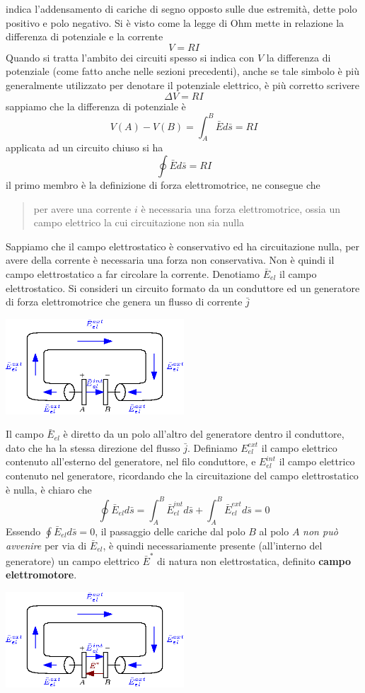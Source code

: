 \documentclass[10pt, letterpaper]{report}
\begin{document}
indica l'addensamento di cariche di segno opposto sulle due estremità, dette polo positivo e polo negativo.\acc 
Si è visto come la legge di Ohm mette in relazione la differenza di potenziale e la corrente 
$$ V=RI$$
Quando si tratta l'ambito dei circuiti spesso si indica con $V$ la differenza di potenziale (come fatto anche nelle sezioni precedenti), anche se tale simbolo è più generalmente utilizzato per denotare il potenziale elettrico, è più corretto scrivere 
$$ \Delta V = RI$$
sappiamo che la differenza di potenziale è 
$$V(A)-V(B)= \int_A^B\bar E d\bar s=RI $$
applicata ad un circuito chiuso si ha 
$$ \oint \bar Ed\bar s = RI$$
il primo membro è la definizione di forza elettromotrice, ne consegue che \begin{quote}
    per avere una corrente $i$ è necessaria una forza elettromotrice, ossia un campo elettrico la cui circuitazione non sia nulla 
\end{quote} 
Sappiamo che il campo elettrostatico è conservativo ed ha circuitazione nulla, per avere della corrente è necessaria una forza non conservativa. Non è quindi il campo elettrostatico a far circolare la corrente. Denotiamo $\bar E_{el}$ il campo elettrostatico. Si consideri un circuito formato da un conduttore ed un generatore di forza elettromotrice che genera un flusso di corrente $\bar j$\begin{center}
    \includegraphics[width=0.5\textwidth]{images/circuito2.eps}
\end{center}
Il campo $\bar E_{el}$ è diretto da un polo all'altro del generatore dentro il conduttore, dato che ha la stessa direzione del flusso $\bar j$. Definiamo $E_{el}^{ext}$ il campo elettrico contenuto all'esterno del generatore, nel filo conduttore, e $E_{el}^{int}$ il campo elettrico contenuto nel generatore, ricordando che la circuitazione del campo elettrostatico è nulla, è chiaro che 
$$ \oint\bar  E_{el}d\bar s = \int_A^B \bar E_{el}^{int}d\bar s + \int_A^B \bar E_{el}^{ext}d\bar s=0$$
Essendo $\oint \bar E_{el}d\bar s=0$, il passaggio delle cariche dal polo $B$ al polo $A$ \textit{non può avvenire} per via di $\bar E_{el}$, è quindi necessariamente presente (all'interno del generatore) un campo elettrico $\bar E^*$ di natura non elettrostatica, definito \textbf{campo elettromotore}.\begin{center}
    \includegraphics[width=0.5\textwidth]{images/circuito3.eps}
\end{center}
\end{document}
